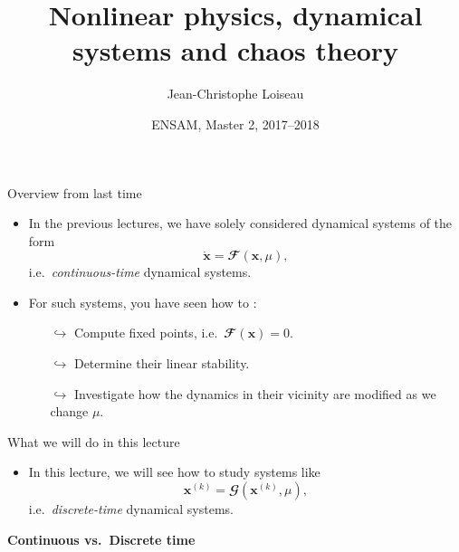 \documentclass[usenames,dvipsnames,svgnames,10pt,aspectratio=169]{beamer}
\title[Nonlinear Physics] %
{
	Nonlinear physics, dynamical \\ systems and chaos theory
}
\author[J.-Ch.~Loiseau] %
{
	Jean-Christophe Loiseau
}
\institute[unused]
{
	\url{jean-christophe.loiseau@ensam.eu} \\
	DynFluid, \\
	Arts et M\'etiers ParisTech, France
}
\date[unused]{ENSAM, Master 2, 2017--2018}
\begin{document}
\titleframe %


\begin{frame}[t, c]{Overview from last time}{}
	\begin{itemize}
		\item In the previous lectures, we have solely considered dynamical systems of the form
		$$\dot{\mathbf{x}} = \mathbfcal{F}\left( \mathbf{x}, \mu \right),$$
		i.e.\ \emph{continuous-time} dynamical systems.

		\bigskip

		\item For such systems, you have seen how to :
		\begin{itemize}
			\item[$\hookrightarrow$] Compute fixed points, i.e.\ $\mathbfcal{F}\left( \mathbf{x} \right) = 0$.
			\item[$\hookrightarrow$] Determine their linear stability.
			\item[$\hookrightarrow$] Investigate how the dynamics in their vicinity are modified as we change $\mu$.
		\end{itemize}
	\end{itemize}

	\vspace{1cm}
\end{frame}

\begin{frame}[t, c]{What we will do in this lecture}{}
	\begin{itemize}
		\item In this lecture, we will see how to study systems like
		$$\mathbf{x}^{(k)} = \mathbfcal{G}\left( \mathbf{x}^{(k)}, \mu \right),$$
		i.e.\ \emph{discrete-time} dynamical systems.
	\end{itemize}

	\vspace{1cm}
\end{frame}

\begin{frame}[t, c]{}
	\centering
	\vspace{1cm}

	{\Large \textbf{Continuous vs.\ Discrete time}}

	\bigskip

	{}

\end{frame}
\end{document}

